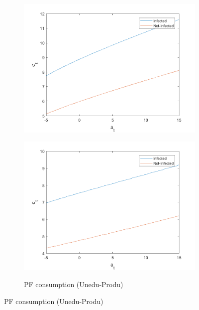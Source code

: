 \begin{figure}[H]
\begin{subfigure}{0.5\textwidth}
   \includegraphics[width=\linewidth,height = 0.22\textheight]{figures/art/FIG8.png}
    \label{fig_dert}
\end{subfigure}
\hspace*{\fill}
\begin{subfigure}{0.5\textwidth}\caption{PF consumption (Unedu-Produ)}
   \includegraphics[width=\linewidth,height = 0.22\textheight]{figures/art/FIG7.png}
    \label{fig:x_b}
\end{subfigure}
\hspace*{\fill}
\label{lafigura6}
\end{figure}
\newpage
